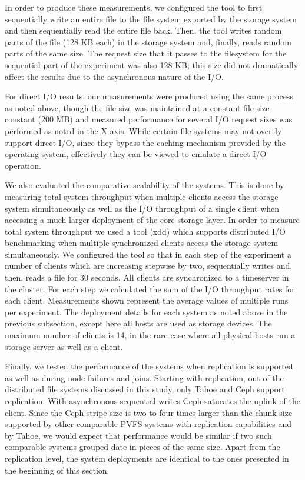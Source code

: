 \documentclass[11pt]{article}
\begin{document}
In order to produce these measurements, we configured the tool to first 
sequentially write an entire file to the file system exported by the storage 
system and then sequentially read the entire file back. Then, the tool writes 
random parts of the file (128 KB each) in the storage system and, finally, 
reads random parts of the same size. The request size that it passes to the 
filesystem for the sequential part of the experiment was also 128 KB; this 
size did not dramatically affect the results due to the asynchronous nature 
of the I/O. 

For direct I/O results, our measurements were produced using 
the same process as noted above, though the file size was maintained at 
a constant file size constant (200 MB) and measured performance for several 
I/O request sizes was performed as noted in the X-axis. While certain file 
systems may not overtly support direct I/O, since they bypass the caching 
mechanism provided by the operating system, effectively they can be viewed 
to emulate a direct I/O operation.

We also evaluated the comparative scalability of the systems. This is 
done by measuring total system throughput when multiple clients access 
the storage system simultaneously as well as the I/O throughput of a 
single client when accessing a much larger deployment of the core storage 
layer. In order to measure total system throughput we used a tool (xdd) 
which supports distributed I/O benchmarking when multiple synchronized 
clients access the storage system simultaneously. We configured the tool 
so that in each step of the experiment a number of clients which are 
increasing stepwise by two, sequentially writes and, then, reads a file 
for 30 seconds. All clients are synchronized to a timeserver in the 
cluster. For each step we calculated the sum of the I/O throughput rates 
for each client. Measurements shown represent the average values of 
multiple runs per experiment. The deployment details for each system as 
noted above in the previous subsection, except here all  hosts are used 
as storage devices. The maximum number of clients is 14, in the rare case 
where all physical hosts run a storage server as well as a client.

Finally, we tested the performance of the systems when replication is 
supported as well as during node failures and joins. Starting with 
replication, out of the distributed file systems discussed in this study, 
only Tahoe and Ceph support replication. With asynchronous sequential 
writes Ceph saturates the uplink of the client. Since the Ceph stripe size 
is two to four times larger than the chunk size supported by other 
comparable PVFS systems with replication capabilities and by Tahoe, we 
would expect that performance would be similar if two such comparable 
systems grouped date in pieces of the same size. Apart from the 
replication level, the system deployments are identical to the ones 
presented in the beginning of this section.
\end{document}
